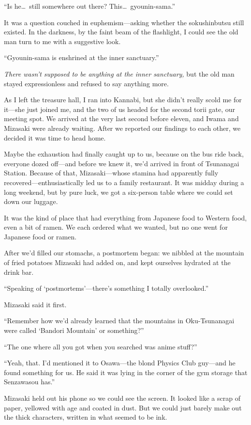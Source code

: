 \documentclass[
    a4paper,
    12pt,
    twoside,
    openany,
    UTF8,
    fontset=windows
]{ctexbook}
\begin{document}
``Is he\dots\ still somewhere out there? This\dots\ gyounin-sama.''

It was a question couched in euphemism---asking whether the sokushinbutsu still existed. In the darkness, by the faint beam of the flashlight, I could see the old man turn to me with a suggestive look.

``Gyounin-sama is enshrined at the inner sanctuary.''

\textit{There wasn't supposed to be anything at the inner sanctuary,} but the old man stayed expressionless and refused to say anything more.

As I left the treasure hall, I ran into Kannabi, but she didn't really scold me for it---she just joined me, and the two of us headed for the second torii gate, our meeting spot. We arrived at the very last second before eleven, and Iwama and Mizasaki were already waiting. After we reported our findings to each other, we decided it was time to head home.

Maybe the exhaustion had finally caught up to us, because on the bus ride back, everyone dozed off---and before we knew it, we'd arrived in front of Tsunanagai Station. Because of that, Mizasaki---whose stamina had apparently fully recovered---enthusiastically led us to a family restaurant. It was midday during a long weekend, but by pure luck, we got a six-person table where we could set down our luggage.

It was the kind of place that had everything from Japanese food to Western food, even a bit of ramen. We each ordered what we wanted, but no one went for Japanese food or ramen.

After we'd filled our stomachs, a postmortem began: we nibbled at the mountain of fried potatoes Mizasaki had added on, and kept ourselves hydrated at the drink bar.

``Speaking of `postmortems'---there's something I totally overlooked.''

Mizasaki said it first.

``Remember how we'd already learned that the mountains in Oku-Tsunanagai were called `Bandori Mountain' or something?''

``The one where all you got when you searched was anime stuff?''

``Yeah, that. I'd mentioned it to Osawa---the blond Physics Club guy---and he found something for us. He said it was lying in the corner of the gym storage that Senzawasou has.''

Mizasaki held out his phone so we could see the screen. It looked like a scrap of paper, yellowed with age and coated in dust. But we could just barely make out the thick characters, written in what seemed to be ink.
\end{document}
